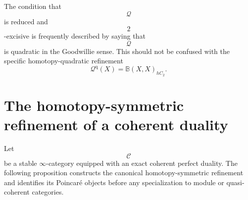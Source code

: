 \begin{remark}
\label{rem:goodwillie-quadratic-terminology}
The condition that
\[
    \mathcal Q
\]
is reduced and
\[
    2
\]
-excisive is frequently described by saying that
\[
    \mathcal Q
\]
is quadratic in the Goodwillie sense. This should not be confused with the
specific homotopy-quadratic refinement
\[
    \mathcal Q^{\mathrm q}(X)
    =
    \mathbb B(X,X)_{hC_2}.
\]
\end{remark}


\section{The homotopy-symmetric refinement of a coherent duality}
\label{sec:homotopy-symmetric-refinement-general}

Let
\[
    \mathcal C
\]
be a stable $\infty$-category equipped with an exact coherent perfect
duality. The following proposition constructs the canonical
homotopy-symmetric refinement and identifies its Poincar\'e objects before
any specialization to module or quasi-coherent categories.

